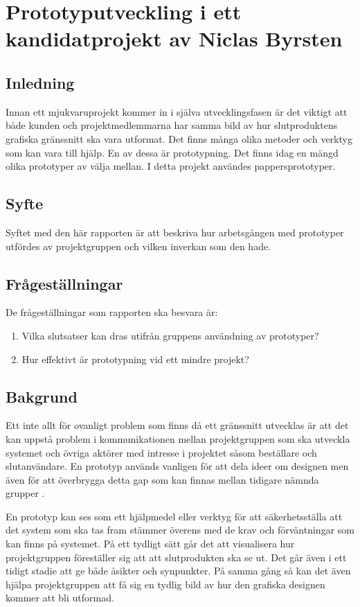 \chapter{Prototyputveckling i ett kandidatprojekt av Niclas Byrsten}\label{appendix:prototyp}

\section{Inledning}
Innan ett mjukvaruprojekt kommer in i själva utvecklingsfasen är det viktigt att både kunden och projektmedlemmarna har samma bild av hur slutproduktens grafiska gränssnitt ska vara utformat. Det finns många olika metoder och verktyg som kan vara till hjälp. En av dessa är prototypning. Det finns idag en mängd olika prototyper av välja mellan. I detta projekt användes pappersprototyper.  

\section{Syfte}
Syftet med den här rapporten är att beskriva hur arbetsgången med prototyper utfördes av projektgruppen och vilken inverkan som den hade.
\section{Frågeställningar}
De frågeställningar som rapporten ska besvara är:
\begin{enumerate}
    \item Vilka slutsatser kan dras utifrån gruppens användning av prototyper? 
    \item Hur effektivt är prototypning vid ett mindre projekt?
\end{enumerate}

\section{Bakgrund}
Ett inte allt för ovanligt problem som finns då ett gränssnitt utvecklas är att det kan uppstå problem i kommunikationen mellan projektgruppen som ska utveckla systemet och övriga aktörer med intresse i projektet såsom beställare och slutanvändare. En prototyp används vanligen för att dela ideer om designen men även för att överbrygga detta gap som kan finnas mellan tidigare nämnda grupper \cite{caseStudy}. 

En prototyp kan ses som ett hjälpmedel eller verktyg för att säkerhetsställa att det system som ska tas fram stämmer överens med de krav och förväntningar som kan finns på systemet. På ett tydligt sätt går det att visualisera hur projektgruppen föreställer sig att att slutprodukten ska se ut. Det går även i ett tidigt stadie att ge både åsikter och synpunkter. På samma gång så kan det även hjälpa projektgruppen att få sig en tydlig bild av hur den grafiska designen kommer att bli utformad. 

